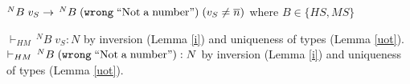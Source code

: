 \begin{case}
$^{N}B\;v_{S}\rightarrow\,^{N}B\;(\mathtt{wrong}\;\mathrm{``Not\;a\;number"})\;(v_{S}\neq\overline{n})$ where $B\in\lbrace HS,MS\rbrace$

$\vdash_{HM}\,^{N}B\;v_{S}:N$ by inversion (Lemma \ref{i}) and uniqueness of types (Lemma \ref{uot}).  $\vdash_{HM}\,^{N}B\;(\mathtt{wrong}\;\mathrm{``Not\;a\;number"}):N$ by inversion (Lemma \ref{i}) and uniqueness of types (Lemma \ref{uot}).
\end{case}